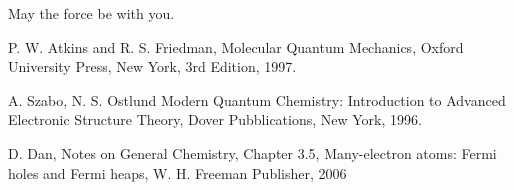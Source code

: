 \documentclass[a4paper,12pt]{article}
\begin{document}
May the force be with you.



\clearpage
{}
\begin{thebibliography}{9}


%
%

P. W. Atkins and R. S. Friedman,
Molecular Quantum Mechanics,
Oxford University Press, New York,
3rd Edition,
1997.

A. Szabo, N. S. Ostlund
Modern Quantum Chemistry: Introduction to Advanced Electronic Structure Theory,
Dover Pubblications, New York,
1996.

D. Dan, Notes on General Chemistry,
Chapter 3.5, Many-electron atoms: Fermi holes and Fermi heaps,
W. H. Freeman Publisher,
2006


\end{thebibliography}
\end{document}
